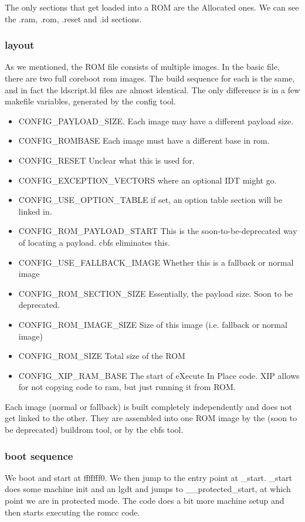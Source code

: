 \documentclass[titlepage,12pt]{article}
\begin{document}
The only sections that get loaded into a ROM are the Allocated ones. We can see the .ram, .rom, .reset and .id sections.
\subsubsection{layout}
As we mentioned, the ROM file consists of multiple images. In the basic file, there are two full coreboot rom images. The build sequence for each is the same, and in fact the ldscript.ld files are almost identical. The only difference is in a few makefile variables, generated by the config tool.

\begin{itemize}
\item CONFIG\_PAYLOAD\_SIZE. Each image may have a different payload size.
\item CONFIG\_ROMBASE Each image must have a different base in rom.
\item CONFIG\_RESET Unclear what this is used for.
\item CONFIG\_EXCEPTION\_VECTORS where an optional IDT might go.
\item CONFIG\_USE\_OPTION\_TABLE if set, an option table section will be linked in.
\item CONFIG\_ROM\_PAYLOAD\_START This is the soon-to-be-deprecated way of locating a payload. cbfs eliminates this.
\item CONFIG\_USE\_FALLBACK\_IMAGE Whether this is a fallback or normal image
\item CONFIG\_ROM\_SECTION\_SIZE Essentially, the payload size. Soon to be deprecated.
\item CONFIG\_ROM\_IMAGE\_SIZE Size of this image (i.e. fallback or normal image)
\item CONFIG\_ROM\_SIZE Total size of the ROM
\item CONFIG\_XIP\_RAM\_BASE The start of eXecute In Place code. XIP allows for not copying code to ram, but just running it from ROM.
\end{itemize}

Each image (normal or fallback) is built completely independently and does not get linked to the other. They are assembled into one ROM image by the (soon to be deprecated) buildrom tool, or by the cbfs tool.

\subsubsection{boot sequence}
We boot and start at fffffff0. We then jump to the entry point at \_start.  \_start does some machine init and an lgdt and jumps to \_\_protected\_start, at which point we are in protected mode. The code does a bit more machine setup and then starts executing the romcc code.
\end{document}
